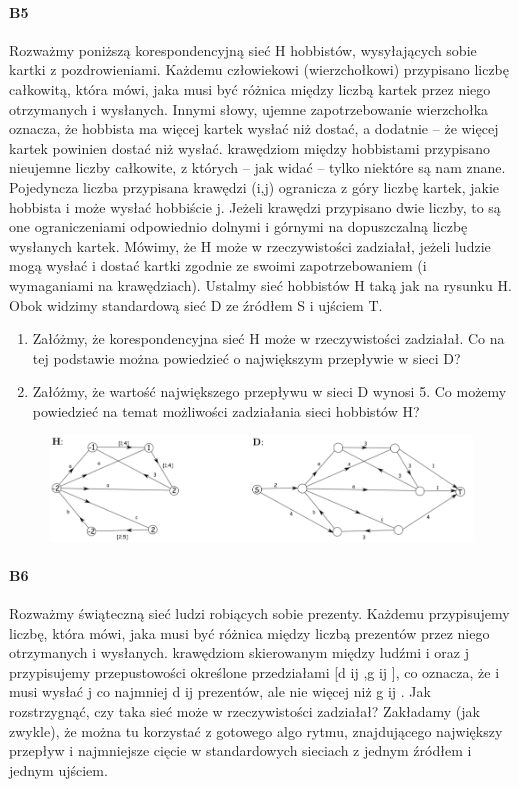 \documentclass[a4paper,12pt]{article}
\theoremstyle{definition}%
\theoremstyle{definition}
\theoremstyle{problem}
\begin{document}
\paragraph{B5} Rozważmy poniższą korespondencyjną  sieć H hobbistów, wysyłających sobie kartki z pozdrowieniami. Każdemu człowiekowi (wierzchołkowi) przypisano liczbę całkowitą, która mówi, jaka musi być różnica między liczbą  kartek przez niego otrzymanych i wysłanych. Innymi słowy, ujemne zapotrzebowanie wierzchołka oznacza, że hobbista ma więcej kartek wysłać niż dostać, a dodatnie – że więcej kartek powinien dostać niż wysłać. krawędziom między hobbistami przypisano nieujemne liczby całkowite, z których – jak widać – tylko niektóre są nam znane. Pojedyncza liczba przypisana krawędzi (i,j) ogranicza z góry liczbę kartek, jakie hobbista i może wysłać hobbiście j. Jeżeli krawędzi przypisano dwie liczby, to są one ograniczeniami odpowiednio dolnymi i górnymi na dopuszczalną liczbę wysłanych kartek. Mówimy, że H może w rzeczywistości zadziałał, jeżeli ludzie mogą wysłać i dostać kartki zgodnie ze swoimi zapotrzebowaniem (i wymaganiami na krawędziach). Ustalmy sieć hobbistów H taką jak na rysunku H. Obok widzimy standardową sieć D ze źródłem S i ujściem T.
\begin{enumerate}[label=\alph*]
\item Załóżmy, że korespondencyjna sieć H może w rzeczywistości zadziałał. Co na tej podstawie można powiedzieć o największym przepływie w sieci D?
\item Załóżmy, że wartość największego przepływu w sieci D wynosi 5. Co możemy powiedzieć na temat możliwości zadziałania sieci hobbistów H?
\end{enumerate}
\begin{figure}[H]
\centering
\includegraphics[width=.9\textwidth]{img/7_B5}
\end{figure}

\paragraph{B6} Rozważmy świąteczną sieć ludzi robiących sobie prezenty. Każdemu przypisujemy liczbę, która mówi, jaka musi być różnica między liczbą prezentów przez niego otrzymanych i wysłanych. krawędziom skierowanym między ludźmi i oraz j przypisujemy przepustowości określone przedziałami [d ij ,g ij ], co oznacza, że i musi wysłać j co najmniej d ij prezentów, ale nie więcej niż g ij . Jak rozstrzygnąć, czy taka sieć może w rzeczywistości zadziałał? Zakładamy (jak zwykle), że można tu korzystać z gotowego algo rytmu, znajdującego największy przepływ i najmniejsze cięcie w standardowych sieciach z jednym źródłem i jednym ujściem.
\end{document}
